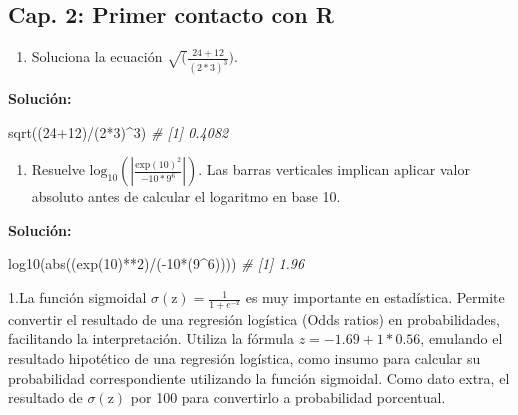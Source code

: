 \documentclass[
]{article}
\newenvironment{Shaded}{\begin{snugshade}}{\end{snugshade}}
\newcommand{\CommentTok}[1]{\textcolor[rgb]{0.56,0.35,0.01}{\textit{#1}}}
\newcommand{\DecValTok}[1]{\textcolor[rgb]{0.00,0.00,0.81}{#1}}
\newcommand{\FunctionTok}[1]{\textcolor[rgb]{0.00,0.00,0.00}{#1}}
\newcommand{\NormalTok}[1]{#1}
\newcommand{\SpecialCharTok}[1]{\textcolor[rgb]{0.00,0.00,0.00}{#1}}
\providecommand{\tightlist}{%
  \setlength{\itemsep}{0pt}\setlength{\parskip}{0pt}}
\theoremstyle{definition}
\theoremstyle{definition}
\theoremstyle{definition}
\theoremstyle{definition}
\theoremstyle{remark}
\begin{document}
\hypertarget{cap.-2-primer-contacto-con-r}{%
\subsection{Cap. 2: Primer contacto con R}\label{cap.-2-primer-contacto-con-r}}

\begin{enumerate}
\def\labelenumi{\arabic{enumi}.}
\tightlist
\item
  Soluciona la ecuación \(\sqrt({\frac{24+12}{(2 * 3)^3})}\).
\end{enumerate}

\textbf{Solución:}

\begin{Shaded}
\begin{Highlighting}[]
\FunctionTok{sqrt}\NormalTok{((}\DecValTok{24}\SpecialCharTok{+}\DecValTok{12}\NormalTok{)}\SpecialCharTok{/}\NormalTok{(}\DecValTok{2}\SpecialCharTok{*}\DecValTok{3}\NormalTok{)}\SpecialCharTok{\^{}}\DecValTok{3}\NormalTok{)}
\CommentTok{\# [1] 0.4082}
\end{Highlighting}
\end{Shaded}

\begin{enumerate}
\def\labelenumi{\arabic{enumi}.}
\tightlist
\item
  Resuelve \(\mathrm{log_{10}}(|\frac{\mathrm{exp(10)}^2}{-10*9^{6}}|)\). Las barras verticales implican aplicar valor absoluto antes de calcular el logaritmo en base 10.
\end{enumerate}

\textbf{Solución:}

\begin{Shaded}
\begin{Highlighting}[]
\FunctionTok{log10}\NormalTok{(}\FunctionTok{abs}\NormalTok{((}\FunctionTok{exp}\NormalTok{(}\DecValTok{10}\NormalTok{)}\SpecialCharTok{**}\DecValTok{2}\NormalTok{)}\SpecialCharTok{/}\NormalTok{(}\SpecialCharTok{{-}}\DecValTok{10}\SpecialCharTok{*}\NormalTok{(}\DecValTok{9}\SpecialCharTok{\^{}}\DecValTok{6}\NormalTok{))))}
\CommentTok{\# [1] 1.96}
\end{Highlighting}
\end{Shaded}

1.La función sigmoidal \(\sigma(\mathrm{z}) = \frac{1}{1+e^{-\mathrm{z}}}\) es muy importante en estadística. Permite convertir el resultado de una regresión logística (Odds ratios) en probabilidades, facilitando la interpretación. Utiliza la fórmula \(z = -1.69 + 1*0.56\), emulando el resultado hipotético de una regresión logística, como insumo para calcular su probabilidad correspondiente utilizando la función sigmoidal. Como dato extra, el resultado de \(\sigma(\mathrm{z})\) por 100 para convertirlo a probabilidad porcentual.
\end{document}
